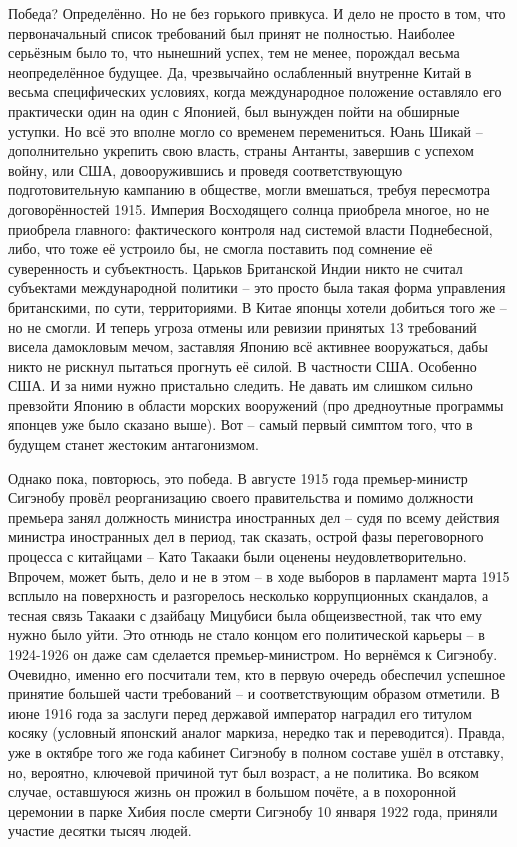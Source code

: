 Победа? Определённо. Но не без горького привкуса. И дело не просто в том, что первоначальный список требований был принят не полностью. Наиболее серьёзным было то, что нынешний успех, тем не менее, порождал весьма неопределённое будущее. Да, чрезвычайно ослабленный внутренне Китай в весьма специфических условиях, когда международное положение оставляло его практически один на один с Японией, был вынужден пойти на обширные уступки. Но всё это вполне могло со временем перемениться. Юань Шикай – дополнительно укрепить свою власть, страны Антанты, завершив с успехом войну, или США, довооружившись и проведя соответствующую подготовительную кампанию в обществе, могли вмешаться, требуя пересмотра договорённостей 1915. Империя Восходящего солнца приобрела многое, но не приобрела главного: фактического контроля над системой власти Поднебесной, либо, что тоже её устроило бы, не смогла поставить под сомнение её суверенность и субъектность. Царьков Британской Индии никто не считал субъектами международной политики – это просто была такая форма управления британскими, по сути, территориями. В Китае японцы хотели добиться того же – но не смогли. И теперь угроза отмены или ревизии принятых 13 требований висела дамокловым мечом, заставляя Японию всё активнее вооружаться, дабы никто не рискнул пытаться прогнуть её силой. В частности США. Особенно США. И за ними нужно пристально следить. Не давать им слишком сильно превзойти Японию в области морских вооружений (про дредноутные программы японцев уже было сказано выше). Вот – самый первый симптом того, что в будущем станет жестоким антагонизмом.

Однако пока, повторюсь, это победа. В августе 1915 года премьер-министр Сигэнобу провёл реорганизацию своего правительства и помимо должности премьера занял должность министра иностранных дел – судя по всему действия министра иностранных дел в период, так сказать, острой фазы переговорного процесса с китайцами – Като Такааки были оценены неудовлетворительно. Впрочем, может быть, дело и не в этом – в ходе выборов в парламент марта 1915 всплыло на поверхность и разгорелось несколько коррупционных скандалов, а тесная связь Такааки с дзайбацу Мицубиси была общеизвестной, так что ему нужно было уйти. Это отнюдь не стало концом его политической карьеры – в 1924-1926 он даже сам сделается премьер-министром. Но вернёмся к Сигэнобу. Очевидно, именно его посчитали тем, кто в первую очередь обеспечил успешное принятие большей части требований – и соответствующим образом отметили. В июне 1916 года за заслуги перед державой император наградил его титулом косяку (условный японский аналог маркиза, нередко так и переводится). Правда, уже в октябре того же года кабинет Сигэнобу в полном составе ушёл в отставку, но, вероятно, ключевой причиной тут был возраст, а не политика. Во всяком случае, оставшуюся жизнь он прожил в большом почёте, а в похоронной церемонии в парке Хибия после смерти Сигэнобу 10 января 1922 года, приняли участие десятки тысяч людей.

